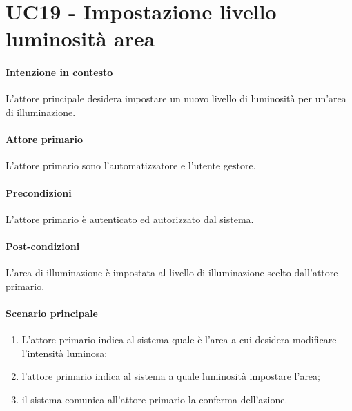\section{UC19 - Impostazione livello luminosità area}\label{uc:19}
\paragraph{Intenzione in contesto} L'attore principale desidera impostare un nuovo livello di luminosità per un'area di illuminazione.
\paragraph{Attore primario} L'attore primario sono l'automatizzatore e l'utente gestore.
\paragraph{Precondizioni} L'attore primario è autenticato ed autorizzato dal sistema.
\paragraph{Post-condizioni} L'area di illuminazione è impostata al livello di illuminazione scelto dall'attore primario.
\paragraph{Scenario principale}
\begin{enumerate}
    \item L'attore primario indica al sistema quale è l'area a cui desidera modificare l'intensità luminosa;
    \item l'attore primario indica al sistema a quale luminosità impostare l'area;
    \item il sistema comunica all'attore primario la conferma dell'azione.
\end{enumerate}